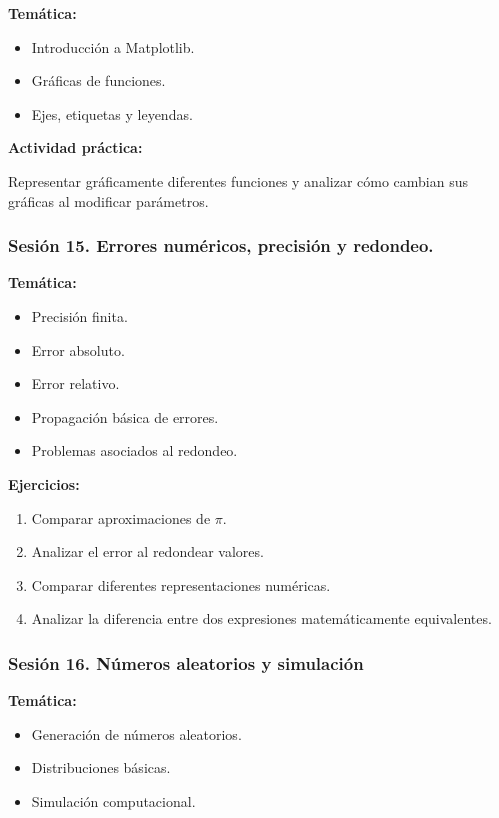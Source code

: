\documentclass[12pt,letterpaper]{article}
\begin{document}
\textbf{Temática:}
\begin{itemize}[noitemsep]
    \item Introducción a Matplotlib.
    \item Gráficas de funciones.
    \item Ejes, etiquetas y leyendas.
\end{itemize}

\textbf{Actividad práctica:}

Representar gráficamente diferentes funciones y analizar cómo cambian sus gráficas al modificar parámetros.

\subsubsection*{Sesión 15. Errores numéricos, precisión y redondeo.}

\textbf{Temática:}
\begin{itemize}[noitemsep]
    \item Precisión finita.
    \item Error absoluto.
    \item Error relativo.
    \item Propagación básica de errores.
    \item Problemas asociados al redondeo.
\end{itemize}

\textbf{Ejercicios:}
\begin{enumerate}[noitemsep]
    \item Comparar aproximaciones de $\pi$.
    \item Analizar el error al redondear valores.
    \item Comparar diferentes representaciones numéricas.
    \item Analizar la diferencia entre dos expresiones matemáticamente
    equivalentes.
\end{enumerate}

\subsubsection*{Sesión 16. Números aleatorios y simulación}

\textbf{Temática:}
\begin{itemize}[noitemsep]
    \item Generación de números aleatorios.
    \item Distribuciones básicas.
    \item Simulación computacional.
\end{itemize}
\end{document}
